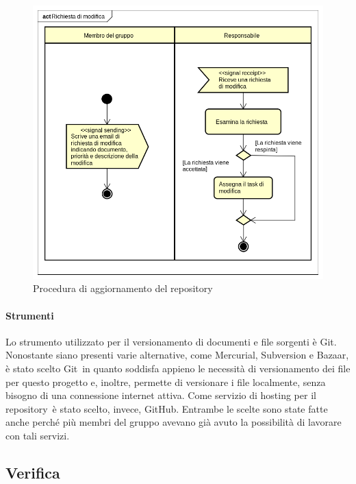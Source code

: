 \documentclass[../NormeProgetto.tex]{subfiles}
\begin{document}
				\begin{figure}[H]
					\centering
					\includegraphics[scale=0.5, width=\textwidth]{sections/img/proceduraRichiestaModifica.png}
					\caption{Procedura di aggiornamento del repository}\label{fig:Procedura di aggiornamento del repository} 
				\end{figure}	
		\paragraph{Strumenti}
			Lo strumento utilizzato per il versionamento di documenti e file sorgenti è Git\g. Nonostante siano presenti varie alternative, come Mercurial, Subversion e Bazaar, è stato scelto Git\g\ in quanto soddisfa appieno le necessità di versionamento dei file per questo progetto e, inoltre, permette di versionare i file localmente, senza bisogno di una connessione internet attiva. Come servizio di hosting per il repository\g\ è stato scelto, invece, GitHub\g. Entrambe le scelte sono state fatte anche perché più membri del gruppo avevano già avuto la possibilità di lavorare con tali servizi.
	
	
\subsection{Verifica}
\end{document}
